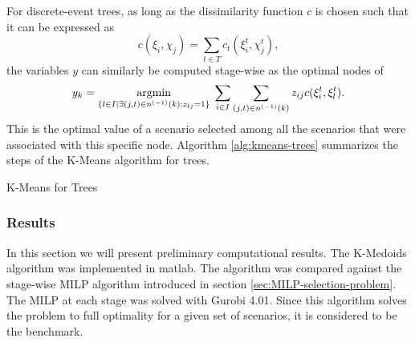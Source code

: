 For discrete-event trees, as long as the dissimilarity function $c$ is chosen such that it can be expressed as
\begin{equation}
  \label{eq:16}
  c(\xi_i, \chi_j) = \sum_{t\in T}c_t(\xi_i^t,\chi_j^t),
\end{equation}
the variables $y$ can similarly be computed stage-wise as the optimal nodes of
\begin{equation}
  \label{eq:17}
  y_k = \underset{\{l\in I|\exists (j,t)\in n^{(-1)}(k):z_{lj}=1\} }{\operatorname{argmin}}\; \sum_{i\in I}\sum_{(j,t)\in n^{(-1)}(k)}z_{ij}c(\xi_i^t, \xi_l^t).
\end{equation}
This is the optimal value of a scenario selected among all the scenarios that were associated with this specific node.
Algorithm \ref{alg:kmeans-trees} summarizes the steps of the K-Means algorithm for trees.
\begin{algorithm}
  \caption{K-Means for Trees}
  \label{alg:kmeans-trees}
  \BlankLine
\end{algorithm}
\subsubsection{Results}
\label{sec:kmeans-results}
In this section we will present preliminary computational results.
The K-Medoids  algorithm was implemented in {\sc matlab}.
The algorithm was compared against the stage-wise MILP algorithm introduced in section \ref{sec:MILP-selection-problem}.
The MILP at each stage was solved with Gurobi 4.01.
Since this algorithm solves the problem to full optimality for a given set of scenarios, it is considered to be the benchmark.

